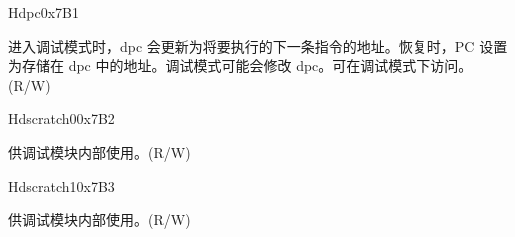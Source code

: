 \begin{register}{H}{dpc}{0x7B1}\label{regdesc:LPDPC}
%
\regnewline%
\begin{regdesc}\begin{reglist}
\label{dpcr}\item [dpc] 进入调试模式时，dpc 会更新为将要执行的下一条指令的地址。恢复时，PC 设置为存储在 dpc 中的地址。调试模式可能会修改 dpc。可在调试模式下访问。 (R/W)
\end{reglist}\end{regdesc}
\end{register}


\begin{register}{H}{dscratch0}{0x7B2}\label{regdesc:LPDSCRATCH0}
%
\regnewline%
\begin{regdesc}\begin{reglist}
\label{dscratch0}\item [dscratch0] 供调试模块内部使用。(R/W)
\end{reglist}\end{regdesc}
\end{register}

\begin{register}{H}{dscratch1}{0x7B3}\label{regdesc:LPDSCRATCH1}
%
\regnewline%
\begin{regdesc}\begin{reglist}
\label{dscratch1}\item [dscratch1] 供调试模块内部使用。(R/W)
\end{reglist}\end{regdesc}
\end{register}
